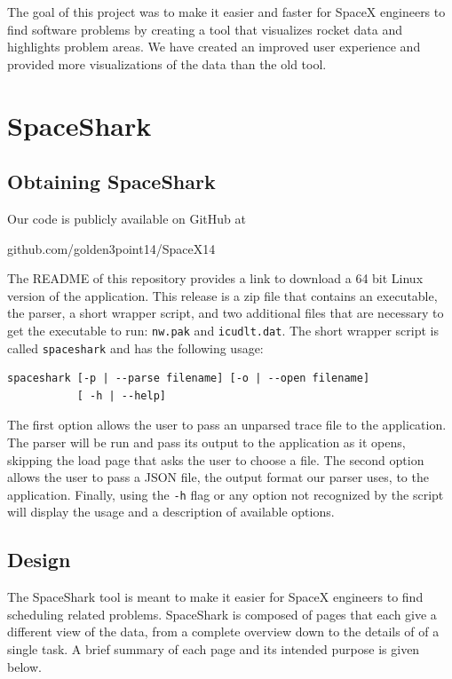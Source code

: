 \documentclass{hmcclinic}
\begin{document}
The goal of this project was to make it easier and faster for SpaceX engineers
to find software problems by creating a tool that visualizes rocket data and
highlights problem areas. We have created an improved user experience and
provided more visualizations of the data than the old tool. 
\chapter{SpaceShark}

\section{Obtaining SpaceShark}
  Our code is publicly available on GitHub at
\begin{center}
  github.com/golden3point14/SpaceX14
\end{center}
The README of this repository provides a link to download a
  64 bit Linux version of the application. This release is a zip file that
  contains an executable, the parser, a short wrapper script, and two additional
  files that are necessary to get the executable to run: \texttt{nw.pak} and
  \texttt{icudlt.dat}.
  The short wrapper script is called \texttt{spaceshark} and has the following usage:

\begin{verbatim}spaceshark [-p | --parse filename] [-o | --open filename] 
           [ -h | --help]\end{verbatim}

  The first option allows the user to pass an unparsed trace file to the
  application. The parser will be run and pass its output 
  to the application as it opens, skipping the load page that asks the
  user to choose a file. The second option allows the user to pass a
  JSON file, the output format our parser uses, to the application. Finally, using the \texttt{-h} flag or any option
  not recognized by the script will display the usage and a description of
  available options.

\section{Design}

  The SpaceShark tool is meant to make it easier for SpaceX engineers to find
  scheduling related problems.  SpaceShark is composed of pages that each give a
  different view of the data, from a complete overview down to the details of
  of a single task. A brief summary of each page and its intended purpose is
  given below.
\end{document}
